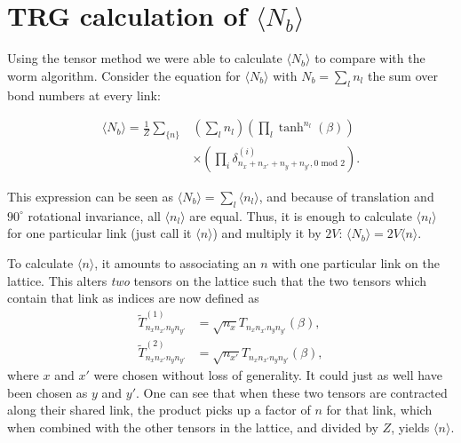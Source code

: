 \documentclass[../main.tex]{subfiles}
\begin{document}
\section{TRG calculation of \texorpdfstring{$\langle N_b \rangle$}{<Nb>}}
\label{sec:nbtrg}

Using the tensor method we were able to calculate $\langle N_{b} \rangle$ to compare with the worm algorithm.  Consider
the equation for $\langle N_{b} \rangle$ with $N_{b} = \sum_{l} n_{l}$ the sum over bond numbers at every link:

\begin{align}
    \langle N_{b} \rangle = \frac{1}{Z} \sum_{ \{ n \} } &\left( \sum_{l} n_{l}
    \right) \left( \prod_{l} \tanh^{n_{l}}(\beta) \right) \\ 
    \nonumber &\times \left( \prod_{i} \delta^{(i)}_{n_{x}+n_{x'}+n_{y}+n_{y'},
    0\text{ mod }2} \right).
\end{align}

This expression can be seen as $\langle N_{b} \rangle = \sum_{l} \langle n_{l} \rangle$, and because of translation and
$90^{\circ}$ rotational invariance, all $\langle n_{l} \rangle$ are equal.  Thus, it is enough to calculate $\langle
n_{l} \rangle$ for one particular link (just call it $\langle n\rangle$) and multiply it by $2V$: $\langle N_{b}
\rangle = 2V \langle n \rangle$.

To calculate $\langle n \rangle$, it amounts to associating an $n$ with one particular link on the lattice.  This
alters \emph{two} tensors on the lattice such that the two tensors which contain that link as indices are now defined
as
\begin{align}
	\tilde{T}^{(1)}_{n_{x} n_{x'} n_{y} n_{y'}}  &=
    \sqrt{n_{x}} T_{n_{x} n_{x'} n_{y} n_{y'}} (\beta),\\
    \tilde{T}^{(2)}_{n_{x} n_{x'} n_{y} n_{y'}}  &=
    \sqrt{n_{x'}}T_{n_{x} n_{x'} n_{y} n_{y'}} (\beta),
\end{align}
where $x$ and $x'$ were chosen without loss of generality.  It could just as well have been chosen as $y$ and $y'$.
One can see that when these two tensors are contracted along their shared link, the product picks up a factor of $n$
for that link, which when combined with the other tensors in the lattice, and divided by $Z$, yields $\langle n
\rangle$.
\end{document}
